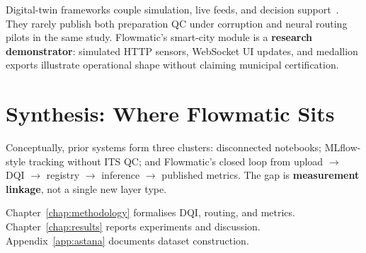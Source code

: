 Digital-twin frameworks couple simulation, live feeds, and decision support~\cite{mazzetto2024urban}. They rarely publish both preparation QC under corruption and neural routing pilots in the same study. Flowmatic's smart-city module is a \textbf{research demonstrator}: simulated HTTP sensors, WebSocket UI updates, and medallion exports illustrate operational shape without claiming municipal certification.

\section{Synthesis: Where Flowmatic Sits}

Conceptually, prior systems form three clusters: disconnected notebooks; MLflow-style tracking without ITS QC; and Flowmatic's closed loop from upload $\rightarrow$ DQI $\rightarrow$ registry $\rightarrow$ inference $\rightarrow$ published metrics. The gap is \textbf{measurement linkage}, not a single new layer type.

Chapter~\ref{chap:methodology} formalises DQI, routing, and metrics. Chapter~\ref{chap:results} reports experiments and discussion. Appendix~\ref{app:astana} documents dataset construction.
